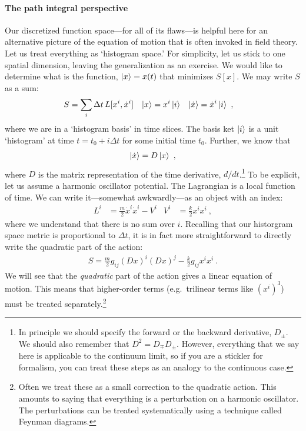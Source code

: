 \paragraph{The path integral perspective} Our discretized function space---for all of its flaws---is helpful here for an alternative picture of the equation of motion that is often invoked in field theory. Let us treat everything as `histogram space.' For simplicity, let us stick to one spatial dimension, leaving the generalization as an exercise. We would like to determine what is the function, $\left|x\right\rangle=x(t)$ that minimizes $S[x]$. We may write $S$ as a sum:
\begin{align}
    S &= \sum_i \Delta t \, L[x^i, \dot x^i] 
    &
    \left|x\right\rangle &= x^i \left|i\right\rangle
    &
    \left|\dot{x}\right\rangle &= \dot{x}^i \left|i\right\rangle \ ,
\end{align}
where we are in a `histogram basis' in time slices. The basis ket $\left|i\right\rangle$ is a unit `histogram' at time $t=t_0 + i\Delta t$ for some initial time $t_0$. Further, we know that 
\begin{align}
    \left|\dot{x}\right\rangle = D\left|x\right\rangle \ ,
\end{align}
where $D$ is the matrix representation of the time derivative, $d/dt$.\footnote{In principle we should specify the forward or the backward derivative, $D_\pm$. We should also remember that $D^2 = D_\mp D_\pm$. However, everything that we say here is applicable to the continuum limit, so if you are a stickler for formalism, you can treat these steps as an analogy to the continuous case.} To be explicit, let us assume a harmonic oscillator potential. The Lagrangian is a local function of time. We can write it---somewhat awkwardly---as an object with an index:
\begin{align}
    L^i &= \frac{m}{2}\dot{x}^i\dot{x}^i - V^i
    &
    V^i &= \frac{k}{2} x^ix^i \ ,
\end{align}
where we understand that there is no sum over $i$. Recalling that our historgram space metric is proportional to $\Delta t$, it is in fact more straightforward to directly write the quadratic part of the action:
\begin{align}
    S 
    =
    \frac{m}{2} g_{ij}(Dx)^i(Dx)^j - \frac{k}{2} g_{ij} x^ix^i
     \ .
    \label{eq:HO:action:discretized}
\end{align}
We will see that the \emph{quadratic} part of the action gives a linear equation of motion. This means that higher-order terms (e.g.\ trilinear terms like $(x^i)^3$) must be treated separately.\footnote{Often we treat these as a small correction to the quadratic action. This amounts to saying that everything is a perturbation on a harmonic oscillator. The perturbations can be treated systematically using a technique called Feynman diagrams.}
